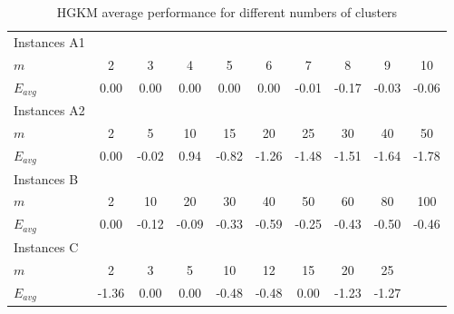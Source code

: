 \begin{table}[H]
\centering
\begin{tabular}{@{}lccccccccc@{}}
\toprule
Instances A1 &       &       &       &       &       &       &       &       &       \\
$m$          & 2     & 3     & 4     & 5     & 6     & 7     & 8     & 9     & 10    \\
$E_{avg}$    & 0.00  & 0.00  & 0.00  & 0.00  & 0.00  & -0.01 & -0.17 & -0.03 & -0.06 \\ \midrule
Instances A2 &       &       &       &       &       &       &       &       &       \\
$m$          & 2     & 5     & 10    & 15    & 20    & 25    & 30    & 40    & 50    \\
$E_{avg}$    & 0.00  & -0.02 & 0.94  & -0.82 & -1.26 & -1.48 & -1.51 & -1.64 & -1.78 \\ \midrule
Instances B  &       &       &       &       &       &       &       &       &       \\
$m$          & 2     & 10    & 20    & 30    & 40    & 50    & 60    & 80    & 100   \\
$E_{avg}$    & 0.00  & -0.12 & -0.09 & -0.33 & -0.59 & -0.25 & -0.43 & -0.50 & -0.46 \\ \midrule
Instances C  &       &       &       &       &       &       &       &       &       \\
$m$          & 2     & 3     & 5     & 10    & 12    & 15    & 20    & 25    &       \\
$E_{avg}$    & -1.36 & 0.00  & 0.00  & -0.48 & -0.48 & 0.00  & -1.23 & -1.27 &       \\ \bottomrule
\end{tabular}
\caption{HGKM average performance for different numbers of clusters}
\label{m-analysis}
\end{table}
